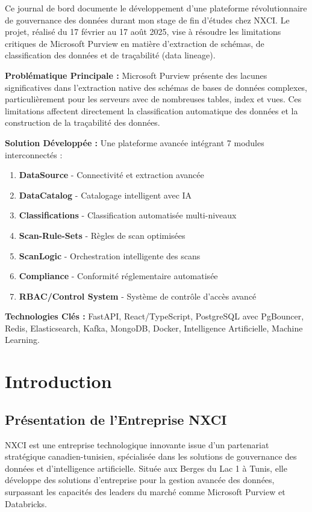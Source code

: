 \documentclass[a4paper,12pt]{article}
\begin{document}
Ce journal de bord documente le développement d'une plateforme révolutionnaire de gouvernance des données durant mon stage de fin d'études chez NXCI. Le projet, réalisé du 17 février au 17 août 2025, vise à résoudre les limitations critiques de Microsoft Purview en matière d'extraction de schémas, de classification des données et de traçabilité (data lineage).

\textbf{Problématique Principale :} Microsoft Purview présente des lacunes significatives dans l'extraction native des schémas de bases de données complexes, particulièrement pour les serveurs avec de nombreuses tables, index et vues. Ces limitations affectent directement la classification automatique des données et la construction de la traçabilité des données.

\textbf{Solution Développée :} Une plateforme avancée intégrant 7 modules interconnectés :
\begin{enumerate}
    \item \textbf{DataSource} - Connectivité et extraction avancée
    \item \textbf{DataCatalog} - Catalogage intelligent avec IA
    \item \textbf{Classifications} - Classification automatisée multi-niveaux
    \item \textbf{Scan-Rule-Sets} - Règles de scan optimisées
    \item \textbf{ScanLogic} - Orchestration intelligente des scans
    \item \textbf{Compliance} - Conformité réglementaire automatisée
    \item \textbf{RBAC/Control System} - Système de contrôle d'accès avancé
\end{enumerate}

\textbf{Technologies Clés :} FastAPI, React/TypeScript, PostgreSQL avec PgBouncer, Redis, Elasticsearch, Kafka, MongoDB, Docker, Intelligence Artificielle, Machine Learning.

\section*{Introduction}

\subsection*{Présentation de l'Entreprise NXCI}

NXCI est une entreprise technologique innovante issue d'un partenariat stratégique canadien-tunisien, spécialisée dans les solutions de gouvernance des données et d'intelligence artificielle. Située aux Berges du Lac 1 à Tunis, elle développe des solutions d'entreprise pour la gestion avancée des données, surpassant les capacités des leaders du marché comme Microsoft Purview et Databricks.
\end{document}
